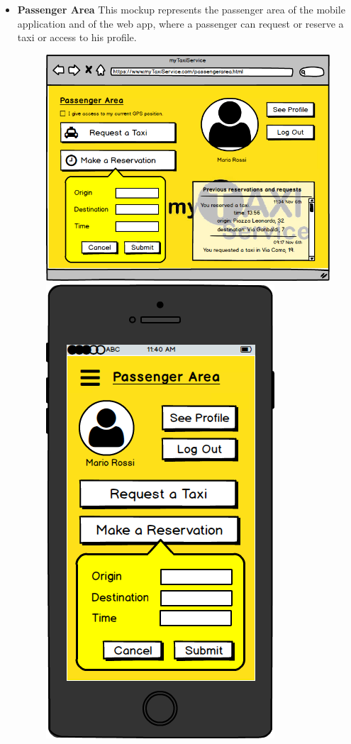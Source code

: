 \documentclass[18pt,oneside,a4paper, titlepage]{article}
\begin{document}
\begin{itemize}
\begin{figure}[h]
				\end{figure}
				\\ 	\\
				\item \textbf{Passenger Area} This mockup represents the passenger area of the mobile application and of the web app, where a passenger can request or reserve a taxi or access to his profile.\\
				\begin{figure}[h]
					\includegraphics[scale=0.3]{WebAppMakeAReservation.png}%
					\qquad\qquad
					\includegraphics[scale=0.3]{MobileAppMakeAReservation.png}

\end{figure}
\end{itemize}
\end{document}
